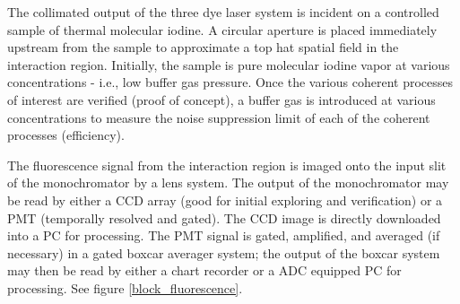 The collimated output of the three dye laser system is incident on a controlled sample of thermal molecular iodine. A circular aperture is placed immediately upstream from the sample to approximate a top hat spatial field in the interaction region. Initially, the sample is pure molecular iodine vapor at various concentrations - i.e., low buffer gas pressure. Once the various coherent processes of interest are verified (proof of concept), a buffer gas is introduced at various concentrations to measure the noise suppression limit of each of the coherent processes (efficiency).

The fluorescence signal from the interaction region is imaged onto the input slit of the monochromator by a lens system. The output of the monochromator may be read by either a CCD array (good for initial exploring and verification) or a PMT (temporally resolved and gated). The CCD image is directly downloaded into a PC for processing. The PMT signal is gated, amplified, and averaged (if necessary) in a gated boxcar averager system; the output of the boxcar system may then be read by either a chart recorder or a ADC equipped PC for processing. See figure \ref{block_fluorescence}.

